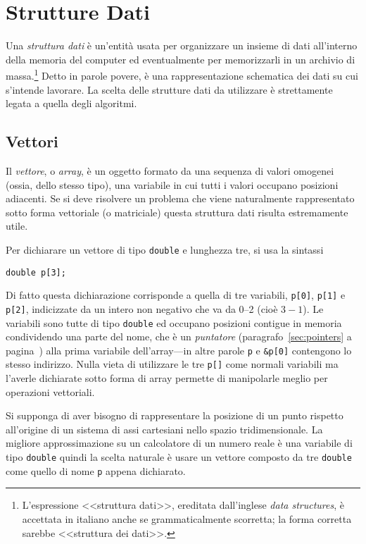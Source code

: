 	\section{Strutture Dati}
Una \emph{struttura dati} è un'entità usata per organizzare un insieme di dati all'interno della memoria del computer ed eventualmente per memorizzarli in un archivio di massa.\footnote{L'espressione <<struttura dati>>, ereditata dall'inglese \emph{data structures}, è accettata in italiano anche se grammaticalmente scorretta; la forma corretta sarebbe <<struttura dei dati>>.}
Detto in parole povere, è una rappresentazione schematica dei dati su cui s'intende lavorare.
La scelta delle strutture dati da utilizzare è strettamente legata a quella degli algoritmi.

		\subsection{Vettori}
		\label{subsec:array}
Il \emph{vettore}, o \emph{array}, è un oggetto formato da una sequenza di valori omogenei (ossia, dello stesso tipo), una variabile in cui tutti i valori occupano posizioni adiacenti.
Se si deve risolvere un problema che viene naturalmente rappresentato sotto forma vettoriale (o matriciale) questa struttura dati risulta estremamente utile.


Per dichiarare un vettore di tipo \lstinline!double! e lunghezza tre, si usa la sintassi
\begin{lstlisting}
double p[3];
\end{lstlisting}
Di fatto questa dichiarazione corrisponde a quella di tre variabili, \lstinline!p[0]!, \lstinline!p[1]! e \lstinline!p[2]!, indicizzate da un intero non negativo che va da \numrange{0}{2} (cioè $3-1$).
Le variabili sono tutte di tipo \lstinline!double! ed occupano posizioni contigue in memoria condividendo una parte del nome, che è un \emph{puntatore} (paragrafo~\ref{sec:pointers} a pagina~\pageref{sec:pointers}) alla prima variabile dell'array---in altre parole \lstinline!p! e \lstinline!&p[0]! contengono lo stesso indirizzo.
Nulla vieta di utilizzare le tre \lstinline!p[!\lstinline!]! come normali variabili ma l'averle dichiarate sotto forma di array permette di manipolarle meglio per operazioni vettoriali.


Si supponga di aver bisogno di rappresentare la posizione di un punto rispetto all'origine di un sistema di assi cartesiani nello spazio tridimensionale.
La migliore approssimazione su un calcolatore di un numero reale è una variabile di tipo \lstinline!double! quindi la scelta naturale è usare un vettore composto da tre \lstinline!double! come quello di nome \lstinline!p! appena dichiarato.




